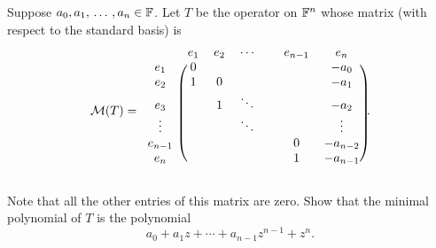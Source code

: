 \begin{xrcs}
  Suppose $a_0, a_1, {\, \ldots \,\,}, a_n \in \mathbb{F}$. Let $T$ be the operator on $\mathbb{F}^n$ whose matrix (with respect to the standard basis) is
  \begin{equation}
    \mmatrix (T) =
    \begin{blockarray}{cccccccc}
               & e_1 & e_2 & \cdots & & e_{n-1} & e_n      \\
      \begin{block}{c(ccccccc)}
        e_1    & 0   &     &        & &         & -a_0     \\
        e_2    & 1   & 0   &        & &         & -a_1     \\
        e_3    &     & 1   & \ddots & &         & -a_2     \\
        \vdots &     &     & \ddots & &         &  \vdots  \\
        e_{n-1}&     &     &        & & 0       & -a_{n-2} \\
        e_n    &     &     &        & & 1       & -a_{n-1} \\
      \end{block}
    \end{blockarray}.
  \end{equation}

  Note that all the other entries of this matrix are zero. Show that the minimal polynomial of $T$ is the polynomial
  \begin{equation}
    a_0 + a_1 z + \cdots + a_{n-1} z^{n-1} + z^n.
  \end{equation}


\end{xrcs}
